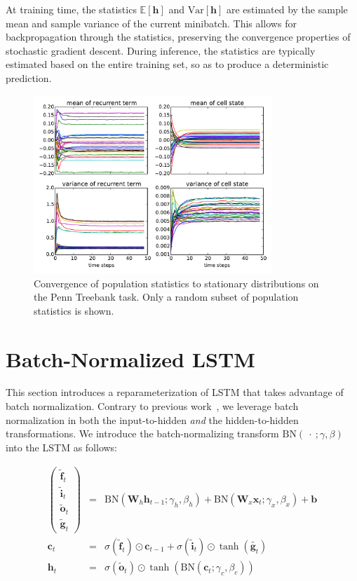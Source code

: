 \documentclass{article} %
\newcommand{\vect}[1]{\mathbf{#1}}
\newcommand{\mat}[1]{\mathbf{#1}}
\newcommand{\ewprod}{\odot}
\begin{document}
At training time, the statistics $\mathbb{E}[\vect{h}]$ and $\mathrm{Var}[\vect{h}]$ are estimated
by the sample mean and sample variance of the current minibatch.
This allows for backpropagation through the statistics, preserving the convergence properties of stochastic gradient descent.
During inference, the statistics are typically estimated based on the entire training set, so as to produce a deterministic prediction.

\begin{figure}[!ht]
\center
\includegraphics[width=0.8\textwidth]{figures/popstat_stationarity.pdf}
\caption{Convergence of population statistics to stationary distributions on the 
Penn Treebank task. Only a random subset of population statistics is shown.}
\label{fig:popstat_stationarity}
\end{figure}



\section{Batch-Normalized LSTM}
\label{sec:recurrent-batch-normalization}

This section introduces a reparameterization of LSTM that takes advantage of 
batch normalization. Contrary to previous work~\cite{cesar, baidu}, we 
leverage batch normalization in both the input-to-hidden \emph{and} the hidden-to-hidden transformations.
We introduce the batch-normalizing transform $\mathrm{BN}(\ \cdot\ ; \gamma, \beta)$ 
into the LSTM as follows:

\begin{eqnarray}
\left(\begin{array}{ccc}
\tilde{\vect{f}}_t \\
\tilde{\vect{i}}_t \\
\tilde{\vect{o}}_t \\
\tilde{\vect{g}}_t
\end{array}\right)
 &=&
 \mathrm{BN} (\mat{W}_h \vect{h}_{t-1}; \gamma_h, \beta_h) +
 \mathrm{BN} (\mat{W}_x \vect{x}_t   ; \gamma_x, \beta_x) +
 \vect{b}
\\
\vect{c}_t &=& \sigma(\tilde{\vect{f}}_t) \ewprod \vect{c}_{t-1} +
               \sigma(\tilde{\vect{i}}_t) \ewprod \tanh(\tilde{\vect{g}_t}) \\
\vect{h}_t &=& \sigma(\tilde{\vect{o}}_t) \ewprod \tanh(
 \mathrm{BN} (\vect{c}_t; \gamma_c, \beta_c)
)
\end{eqnarray}
\end{document}
